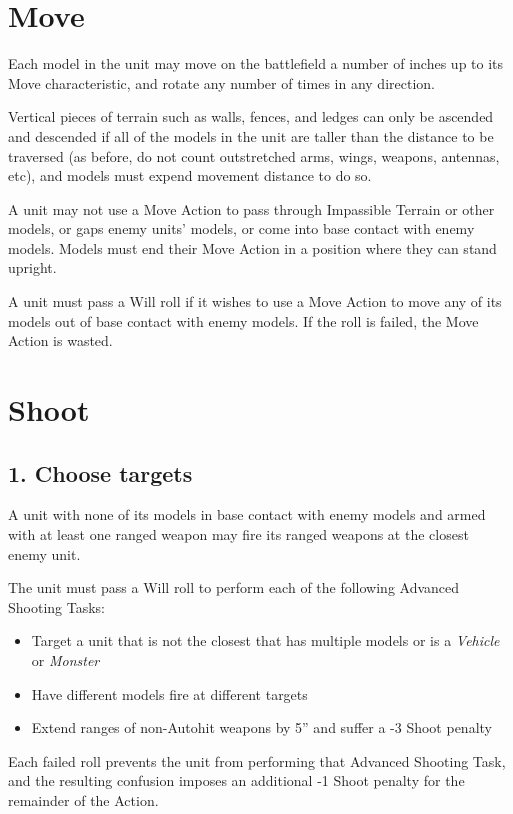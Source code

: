 \begin{multicols}{2}
\section*{Move}
Each model in the unit may move on the battlefield a number of inches up to its Move characteristic, and rotate any number of times in any direction.

Vertical pieces of terrain such as walls, fences, and ledges can only be ascended and descended if all of the models in the unit are taller than the distance to be traversed (as before, do not count outstretched arms, wings, weapons, antennas, etc), and models must expend movement distance to do so.

A unit may not use a Move Action to pass through Impassible Terrain or other models, or gaps enemy units' models, or come into base contact with enemy models. Models must end their Move Action in a position where they can stand upright.

A unit must pass a Will roll if it wishes to use a Move Action to move any of its models out of base contact with enemy models. If the roll is failed, the Move Action is wasted.




\section*{Shoot}
\subsection*{1. Choose targets}
A unit with none of its models in base contact with enemy models and armed with at least one ranged weapon may fire its ranged weapons at the closest enemy unit.

The unit must pass a Will roll to perform each of the following Advanced Shooting Tasks:

\begin{itemize}
    \item Target a unit that is not the closest that has multiple models or is a \textit{Vehicle} or \textit{Monster}
    \item Have different models fire at different targets
    \item Extend ranges of non-Autohit weapons by 5'' and suffer a -3 Shoot penalty
\end{itemize}

Each failed roll prevents the unit from performing that Advanced Shooting Task, and the resulting confusion imposes an additional -1 Shoot penalty for the remainder of the Action.


\end{multicols}
